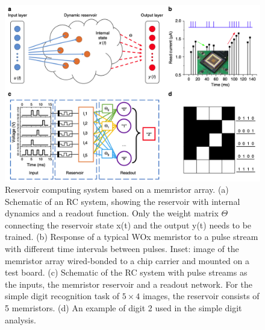 \documentclass[11pt, oneside]{article}
\begin{document}
\begin{figure}[H]
    \centering
    \includegraphics[width=\textwidth]{figs/reservoir-memristor-1.png}

    \caption{Reservoir computing system based on a memristor array. (a) Schematic of an RC system, showing the reservoir with internal dynamics and a readout function. Only the weight matrix $\Theta$ connecting the reservoir state x(t) and the output y(t) needs to be trained. (b) Response of a typical WOx memristor to a pulse stream with different time intervals between pulses. Inset: image of the memristor array wired-bonded to a chip carrier and mounted on a test board. (c) Schematic of the RC system with pulse streams as the inputs, the memristor reservoir and a readout network. For the simple digit recognition task of \( 5 \times 4 \) images, the reservoir consists of 5 memristors. (d) An example of digit 2 used in the simple digit analysis.}
\end{figure}
\end{document}
